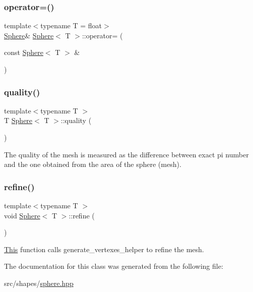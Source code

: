 \mbox{\label{classSphere_ae989d05c3ea71f5a758e90e2f2e3aecf}} 
\subsubsection{\texorpdfstring{operator=()}{operator=()}\hspace{0.1cm}{\footnotesize\ttfamily [2/2]}}
{\footnotesize\ttfamily template$<$typename T = float$>$ \\
\mbox{\hyperlink{classSphere}{Sphere}}\& \mbox{\hyperlink{classSphere}{Sphere}}$<$ T $>$\+::operator= (\begin{DoxyParamCaption}\item[{const \mbox{\hyperlink{classSphere}{Sphere}}$<$ T $>$ \&}]{ }\end{DoxyParamCaption})\hspace{0.3cm}{\ttfamily [default]}}

\mbox{\label{classSphere_a9ebc65dabaf8d87fbe599f4b64816f73}} 
\subsubsection{\texorpdfstring{quality()}{quality()}}
{\footnotesize\ttfamily template$<$typename T $>$ \\
T \mbox{\hyperlink{classSphere}{Sphere}}$<$ T $>$\+::quality (\begin{DoxyParamCaption}{ }\end{DoxyParamCaption})}



The quality of the mesh is measured as the difference between exact pi number and the one obtained from the area of the sphere (mesh). 

\mbox{\label{classSphere_a3f5ee2b07e48a360696fe983690d1d1f}} 
\subsubsection{\texorpdfstring{refine()}{refine()}}
{\footnotesize\ttfamily template$<$typename T $>$ \\
void \mbox{\hyperlink{classSphere}{Sphere}}$<$ T $>$\+::refine (\begin{DoxyParamCaption}{ }\end{DoxyParamCaption})}



\mbox{\hyperlink{classThis}{This}} function calls generate\+\_\+vertexes\+\_\+helper to refine the mesh. 



The documentation for this class was generated from the following file\+:\begin{DoxyCompactItemize}
\item 
src/shapes/\mbox{\hyperlink{sphere_8hpp}{sphere.\+hpp}}\end{DoxyCompactItemize}
